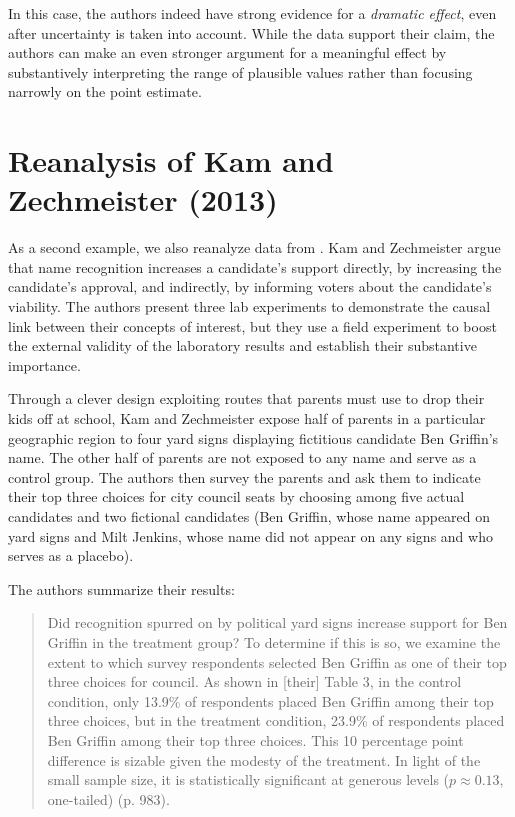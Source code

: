 \documentclass[12pt]{article}
\begin{document}
In this case, the authors indeed have strong evidence for a \emph{dramatic effect}, even after uncertainty is taken into account. While the data support their claim, the authors can make an even stronger argument for a meaningful effect by substantively interpreting the range of plausible values rather than focusing narrowly on the point estimate. 

\section*{Reanalysis of Kam and Zechmeister (2013)}

As a second example, we also reanalyze data from \cite{KamZechmeister2013}. Kam and Zechmeister argue that name recognition increases a candidate's support directly, by increasing the candidate's approval, and indirectly, by informing voters about the candidate's viability. The authors present three lab experiments to demonstrate the causal link between their concepts of interest, but they use a field experiment to boost the external validity of the laboratory results and establish their substantive importance. 

Through a clever design exploiting routes that parents must use to drop their kids off at school, Kam and Zechmeister expose half of parents in a particular geographic region to four yard signs displaying fictitious candidate Ben Griffin's name. The other half of parents are not exposed to any name and serve as a control group. The authors then survey the parents and ask them to indicate their top three choices for city council seats by choosing among five actual candidates and two fictional candidates (Ben Griffin, whose name appeared on yard signs and Milt Jenkins, whose name did not appear on any signs and who serves as a placebo). 

The authors summarize their results:

\begin{quote}
Did recognition spurred on by political yard signs increase support for Ben Griffin in the treatment group? To determine if this is so, we examine the extent to which survey respondents selected Ben Griffin as one of their top three choices for council. As shown in [their] Table 3, in the control condition, only 13.9\% of respondents placed Ben Griffin among their top three choices, but in the treatment condition, 23.9\% of respondents placed Ben Griffin among their top three choices. This 10 percentage point difference is sizable given the modesty of the treatment. In light of the small sample size, it is statistically significant at generous levels ($p \approx 0.13$, one-tailed) (p. 983).
\end{quote}
\end{document}
